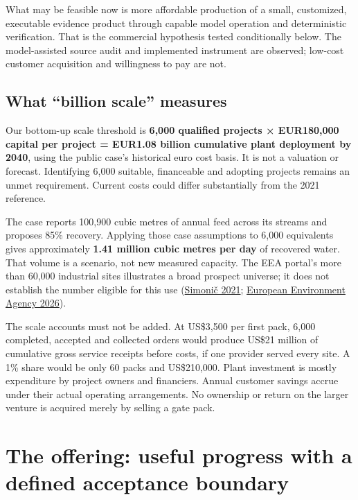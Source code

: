 \documentclass[
  11pt,
  letterpaper,
]{article}
\begin{document}
What may be feasible now is more affordable production of a small,
customized, executable evidence product through capable model operation
and deterministic verification. That is the commercial hypothesis tested
conditionally below. The model-assisted source audit and implemented
instrument are observed; low-cost customer acquisition and willingness
to pay are not.

\hypertarget{what-billion-scale-measures}{%
\subsection{What ``billion scale''
measures}\label{what-billion-scale-measures}}

Our bottom-up scale threshold is \textbf{6,000 qualified projects ×
EUR180,000 capital per project = EUR1.08 billion cumulative plant
deployment by 2040}, using the public case's historical euro cost basis.
It is not a valuation or forecast. Identifying 6,000 suitable,
financeable and adopting projects remains an unmet requirement. Current
costs could differ substantially from the 2021 reference.

The case reports 100,900 cubic metres of annual feed across its streams
and proposes 85\% recovery. Applying those case assumptions to 6,000
equivalents gives approximately \textbf{1.41 million cubic metres per
day} of recovered water. That volume is a scenario, not new measured
capacity. The EEA portal's more than 60,000 industrial sites illustrates
a broad prospect universe; it does not establish the number eligible for
this use (\protect\hyperlink{ref-simonic2021}{Simonič 2021};
\protect\hyperlink{ref-eea}{European Environment Agency 2026}).

The scale accounts must not be added. At US\$3,500 per first pack, 6,000
completed, accepted and collected orders would produce US\$21 million of
cumulative gross service receipts before costs, if one provider served
every site. A 1\% share would be only 60 packs and US\$210,000. Plant
investment is mostly expenditure by project owners and financiers.
Annual customer savings accrue under their actual operating
arrangements. No ownership or return on the larger venture is acquired
merely by selling a gate pack.

\hypertarget{the-offering-useful-progress-with-a-defined-acceptance-boundary}{%
\section{The offering: useful progress with a defined acceptance
boundary}\label{the-offering-useful-progress-with-a-defined-acceptance-boundary}}
\end{document}
